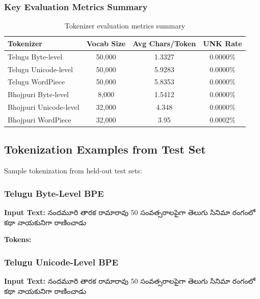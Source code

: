 \documentclass[11pt,a4paper]{article}
\begin{document}
\subsubsection{Key Evaluation Metrics Summary}

\begin{table}[H]
    \centering
    \small
    \begin{tabular}{|l|c|c|c|}
    \hline
    \textbf{Tokenizer} & \textbf{Vocab Size} & \textbf{Avg Chars/Token} & \textbf{UNK Rate} \\
    \hline
    Telugu Byte-level & 50,000 & 1.3327 & 0.0000\% \\
    Telugu Unicode-level & 50,000 & 5.9283 & 0.0000\% \\
    Telugu WordPiece & 50,000 & 5.8353 & 0.0000\% \\
    Bhojpuri Byte-level & 8,000 & 1.5412 & 0.0000\% \\
    Bhojpuri Unicode-level & 32,000 & 4.348 & 0.0000\% \\
    Bhojpuri WordPiece & 32,000 & 3.95 & 0.0002\% \\
    \hline
    \end{tabular}
    \caption{Tokenizer evaluation metrics summary}
    \label{tab:tokenizer_evaluation}
\end{table}


\subsection{Tokenization Examples from Test Set}

Sample tokenization from held-out test sets:

\subsubsection{Telugu Byte-Level BPE}
\textbf{Input Text:} {\teluguFont నందమూరి తారక రామారావు 50 సంవత్సరాలపైగా తెలుగు సినిమా రంగంలో కథా నాయకునిగా రాణించాడు}

\textbf{Tokens:} {\teluguFont ['న', 'ందమూరి', ' ', 'తారక', ' ', 'రామారావు', ' ', '50', ' ', 'సం', 'వత్సరాల', 'పైగా', ' ', 'తెలుగు', ' ', 'సినిమా', ' ', 'రంగంలో', ' ', 'కథా', ...]}

\subsubsection{Telugu Unicode-Level BPE}
\textbf{Input Text:} {\teluguFont నందమూరి తారక రామారావు 50 సంవత్సరాలపైగా తెలుగు సినిమా రంగంలో కథా నాయకునిగా రాణించాడు}
\end{document}
